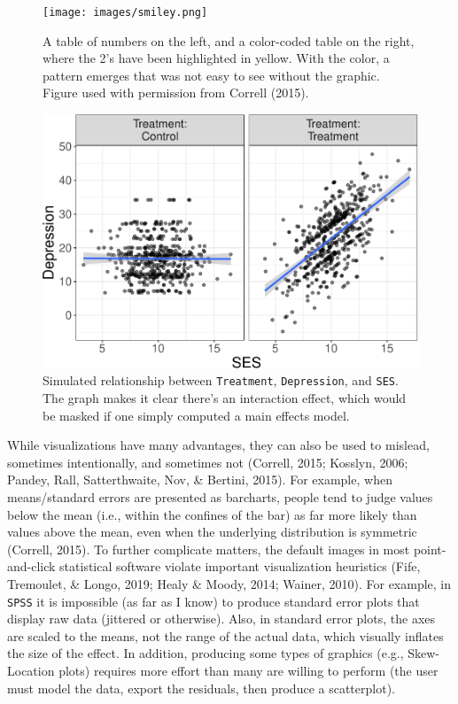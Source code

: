 \documentclass[
  man]{apa6}
\begin{document}
\begin{figure}
\centering
\texttt{[image: images/smiley.png]}
\caption{A table of numbers on the left, and a color-coded table on the right, where the 2's have been highlighted in yellow. With the color, a pattern emerges that was not easy to see without the graphic. Figure used with permission from Correll (2015).}
\label{fig:smiley}
\end{figure}

\begin{figure}
\centering
\includegraphics{flexplot_psychmeth_files/figure-latex/ses-1.pdf}
\caption{\label{fig:ses}Simulated relationship between \texttt{Treatment}, \texttt{Depression}, and \texttt{SES}. The graph makes it clear there's an interaction effect, which would be masked if one simply computed a main effects model.}
\end{figure}

While visualizations have many advantages, they can also be used to mislead, sometimes intentionally, and sometimes not (Correll, 2015; Kosslyn, 2006; Pandey, Rall, Satterthwaite, Nov, \& Bertini, 2015). For example, when means/standard errors are presented as barcharts, people tend to judge values below the mean (i.e., within the confines of the bar) as far more likely than values above the mean, even when the underlying distribution is symmetric (Correll, 2015). To further complicate matters, the default images in most point-and-click statistical software violate important visualization heuristics (Fife, Tremoulet, \& Longo, 2019; Healy \& Moody, 2014; Wainer, 2010). For example, in \texttt{SPSS} it is impossible (as far as I know) to produce standard error plots that display raw data (jittered or otherwise). Also, in standard error plots, the axes are scaled to the means, not the range of the actual data, which visually inflates the size of the effect. In addition, producing some types of graphics (e.g., Skew-Location plots) requires more effort than many are willing to perform (the user must model the data, export the residuals, then produce a scatterplot).
\end{document}
